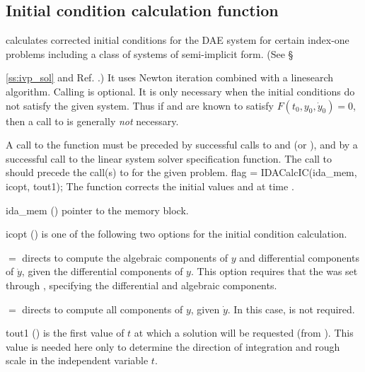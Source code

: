 
\subsection{Initial condition calculation function}\label{ss:idacalcic}

 calculates corrected initial conditions for the DAE system
for certain index-one problems including a class of systems of semi-implicit
form.  (See \S{\ref{ss:ivp_sol} and Ref. \cite{BHP:98}.)
It uses Newton iteration combined with a linesearch algorithm.
Calling  is optional. It is only necessary when the
initial conditions do not satisfy the given system.  Thus if
 and  are known to satisfy $F(t_0, y_0, \dot{y}_0) = 0$,
then a call to  is generally {\em not} necessary.

A call to the function  must be preceded by successful calls to
 and  (or ), and by a
successful call to the linear system solver specification function.
The call to  should precede the call(s) to 
for the given problem.
%
{
  flag = IDACalcIC(ida\_mem, icopt, tout1);
}
{
  The function  corrects the initial values  and  at
  time .
}
{
  \begin{args}

  \item[ida\_mem] ()
    pointer to the {\idas} memory block.

  \item[icopt] ()
    is one of the following two options for the initial condition calculation.

    $ = $ directs  to compute
    the algebraic components of $y$ and differential components of $\dot{y}$,
    given the differential components of $y$.
    This option requires that the   was set through
    , specifying the differential and algebraic components.

    $ = $ directs  to compute all
    components of $y$, given $\dot{y}$.  In this case,  is not required.

  \item[tout1] ()
    is the first value of $t$ at which a solution will be requested (from
    ).  This value is needed here only to determine the direction of
    integration and rough scale in the independent variable $t$.


\end{args}}}
